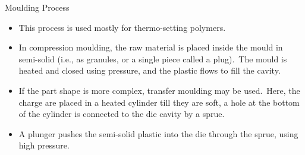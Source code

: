 \documentclass[11pt,t]{beamer}
\begin{document}
    \begin{frame}[allowframebreaks]{Moulding Process}
        \begin{itemize}
            \item This process is used mostly for thermo-setting polymers.
            \item In compression moulding, the raw material is placed inside the mould in semi-solid (i.e., as
            granules, or a single piece called a plug).\ The mould is heated and closed using pressure, and the plastic
            flows to fill the cavity.
            \item If the part shape is more complex, transfer moulding may be used.\ Here, the charge are placed in a
            heated cylinder till they are soft, a hole at the bottom of the cylinder is connected to the die cavity
            by a sprue.
            \item A plunger pushes the semi-solid plastic into the die through the sprue, using high pressure.
        \end{itemize}
    \end{frame}
\end{document}
